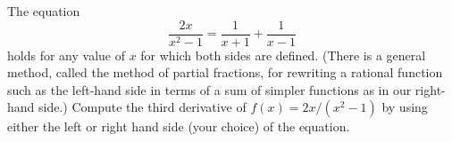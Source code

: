 The equation 
\begin{equation*}
  \frac{2x}{x^2-1}= \frac{1}{x+1}+\frac{1}{x-1}
\end{equation*}
holds for any value of $x$ for which both sides are defined.
(There is a general method, called the method of partial fractions, for rewriting
a rational function such as the left-hand side in terms of a sum of simpler
functions as in our right-hand side.)
Compute the third derivative of $f(x) = 2x/(x^2-1)$ by using either the
left or right hand side (your choice) of the equation.\answercheck
